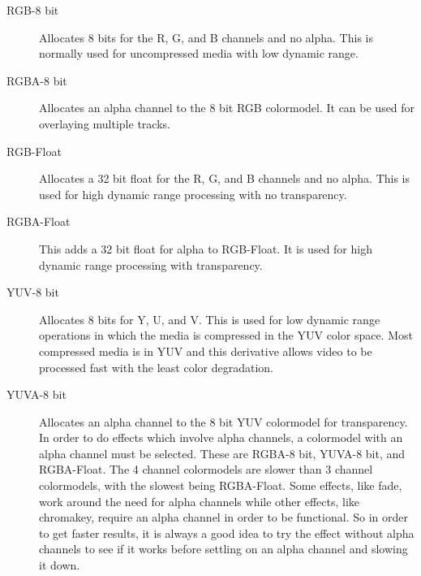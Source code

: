 \begin{description}
        \begin{description}
            \item[RGB-8 bit] 
                Allocates 8 bits for the R, G, and B channels and no alpha. This is normally used for uncompressed media with low dynamic range.
            \item[RGBA-8 bit]
                Allocates an alpha channel to the 8 bit RGB colormodel. It can be used for overlaying multiple tracks.\\
            \item[RGB-Float]
                Allocates a 32 bit float for the R, G, and B channels and no alpha. This is used  for high dynamic range processing with no transparency.
            \item[RGBA-Float]
                This adds a 32 bit float for alpha to RGB-Float. It is used for high dynamic range processing with transparency.\\
            \item[YUV-8 bit]
                Allocates 8 bits for Y, U, and V. This is used for low dynamic range operations in which the media is compressed in the YUV color space. Most compressed media is in YUV and this derivative allows video to be processed fast with the least color degradation.
            \item[YUVA-8 bit]
                Allocates an alpha channel to the 8 bit YUV colormodel for transparency.
                In order to do effects which involve alpha channels, a colormodel with an alpha channel must be selected. 
                These are RGBA-8 bit, YUVA-8 bit, and RGBA-Float. 
                The 4 channel colormodels are slower than 3 channel colormodels, with the slowest being RGBA-Float. 
                Some effects, like fade, work around the need for alpha channels while other effects, like chromakey, require an alpha channel in order to be functional.  
                So in order to get faster results, it is always a good idea to try the effect without alpha channels to see if it works before settling on an alpha channel and slowing it down.


\end{description}
\end{description}
